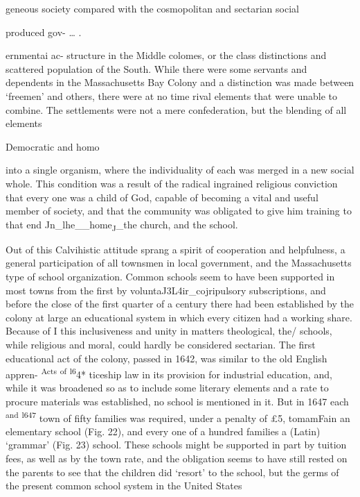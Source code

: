 \documentclass[
]{book}
\begin{document}
geneous society compared with the cosmopolitan and sectarian social

produced gov- \ldots{} .

ernmentai ac- structure in the Middle colomes, or the class distinctions and scattered population of the South. While there were some servants and dependents in the Massachusetts Bay Colony and a distinction was made between `freemen' and others, there were at no time rival elements that were unable to combine. The settlements were not a mere confederation, but the blending of all elements

Democratic and homo

into a single organism, where the individuality of each was merged in a new social whole. This condition was a result of the radical ingrained religious conviction that every one was a child of God, capable of becoming a vital and useful member of society, and that the community was obligated to give him training to that end Jn\_lhe\_\_home\textsubscript{J\textbar{}}\_the church, and the school.

Out of this Calvihistic attitude sprang a spirit of cooperation and helpfulness, a general participation of all townsmen in local government, and the Massachusetts type of school organization. Common schools seem to have been supported in most towns from the first by voluntaJ3L4ir\_cojripulsory subscriptions, and before the close of the first quarter of a century there had been established by the colony at large an educational system in which every citizen had a working share. Because of I this inclusiveness and unity in matters theological, the/ schools, while religious and moral, could hardly be considered sectarian. The first educational act of the colony, passed in 1642, was similar to the old English appren- \textsuperscript{Acts} \textsuperscript{of} \textsuperscript{l6}4* ticeship law in its provision for industrial education, and, while it was broadened so as to include some literary elements and a rate to procure materials was established, no school is mentioned in it. But in 1647 each \textsuperscript{and} \textsuperscript{l647} town of fifty families was required, under a penalty of £5, tomamFain an elementary school (Fig. 22), and every one of a hundred families a (Latin) `grammar' (Fig. 23) school. These schools might be supported in part by tuition fees, as well as by the town rate, and the obligation seems to have still rested on the parents to see that the children did `resort' to the school, but the germs of the present common school system in the United States
\end{document}
